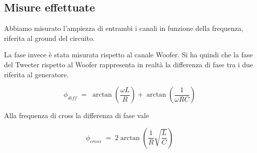 \documentclass[../Relazione_circuiti]{subfiles}
\begin{document}
\subsection{Misure effettuate}
  Abbiamo misurato l'ampiezza di entrambi i canali in funzione della frequenza, riferita al ground del circuito.

  La fase invece è stata misurata rispetto al canale Woofer. Si ha quindi che la fase del Tweeter rispetto al Woofer
  rappresenta in realtà la differenza di fase tra i due riferita al generatore.

  \begin{equation}
    \label{eq:p_diff}
    \phi_{diff} \; = \; \arctan(\frac{\omega L}{R}) + \arctan(\frac{1}{\omega RC})
  \end{equation}

  Alla frequenza di cross la differenza di fase vale

  \begin{equation}
    \label{eq:p_diff_cross}
    \phi_{cross} \; = \; 2 \arctan(\frac{1}{R} \sqrt{\frac{L}{C}})
  \end{equation}
\end{document}

